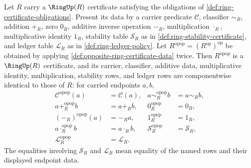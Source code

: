 \begin{theorem}
\label{thm:double-opposite-ring-certificate-data-identity}
Let $R$ carry a $\RingUp(R)$ certificate satisfying the obligations of
\autoref{def:ring-certificate-obligations}. Present its data by a carrier
predicate $\mathcal C$, classifier $\sim_R$, addition $+_R$, zero $0_R$,
additive inverse operation $-_R$, multiplication $\cdot_R$, multiplicative
identity $1_R$, stability table $\mathcal S_R$ as in
\autoref{def:ring-stability-certificate}, and ledger table $\mathcal L_R$ as in
\autoref{def:ring-ledger-policy}. Let
$R^{\mathrm{opop}}=(R^{\mathrm{op}})^{\mathrm{op}}$ be obtained by applying
\autoref{def:opposite-ring-certificate-data} twice. Then
$R^{\mathrm{opop}}$ is a $\RingUp(R)$ certificate, and its carrier,
classifier, additive data, multiplicative identity, multiplication, stability
rows, and ledger rows are componentwise identical to those of $R$: for carried
endpoints $a,b$,
$$
\begin{aligned}
\mathcal C^{\mathrm{opop}}(a)&=\mathcal C(a),&
a\sim_R^{\mathrm{opop}} b&=a\sim_R b,\\
a+_R^{\mathrm{opop}} b&=a+_R b,&
0_R^{\mathrm{opop}}&=0_R,\\
(-_R)^{\mathrm{opop}}(a)&=-_R a,&
1_R^{\mathrm{opop}}&=1_R,\\
a\cdot_R^{\mathrm{opop}} b&=a\cdot_R b,&
\mathcal S_R^{\mathrm{opop}}&=\mathcal S_R,\\
\mathcal L_R^{\mathrm{opop}}&=\mathcal L_R.
\end{aligned}
$$
The equalities involving $\mathcal S_R$ and $\mathcal L_R$ mean equality of the
named rows and their displayed endpoint data.
\end{theorem}
